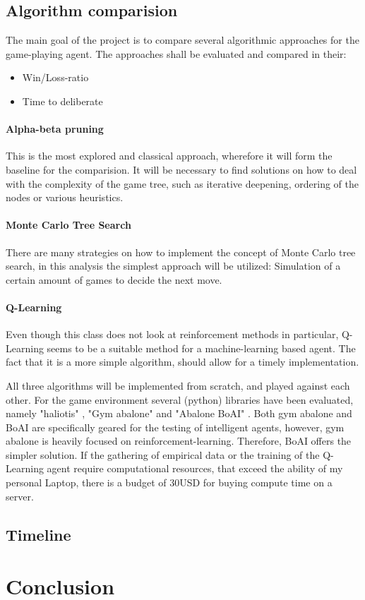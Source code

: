 \documentclass{llncs}
\begin{document}
\subsection{Algorithm comparision}
The main goal of the project is to compare several algorithmic approaches for the game-playing agent. The approaches shall be evaluated and compared in their:

\begin{itemize}
  \item Win/Loss-ratio
  \item Time to deliberate
\end{itemize}


\paragraph{Alpha-beta pruning}
This is the most explored and classical approach, wherefore it will form the baseline for the comparision. It will be necessary to find solutions on how to deal with the complexity of the game tree, such as iterative deepening, ordering of the nodes or various heuristics.

\paragraph{Monte Carlo Tree Search}
There are many strategies on how to implement the concept of Monte Carlo tree search, in this analysis the simplest approach will be utilized: Simulation of a certain amount of games to decide the next move.

\paragraph{Q-Learning}
Even though this class does not look at reinforcement methods in particular, Q-Learning seems to be a suitable method for a machine-learning based agent. The fact that it is a more simple algorithm, should allow for a timely implementation.

All three algorithms will be implemented from scratch, and played against each other. For the game environment several (python) libraries have been evaluated, namely "haliotis" \cite{noauthor_peer_nodate}, "Gym abalone" \cite{towzeur_towzeurgym-abalone_2021} and "Abalone BoAI" \cite{scriptim_scriptimabalone-boai_2021}. Both gym abalone and BoAI are specifically geared for the testing of intelligent agents, however, gym abalone is heavily focused on reinforcement-learning. Therefore, BoAI offers the simpler solution. If the gathering of empirical data or the training of the Q-Learning agent require computational resources, that exceed the ability of my personal Laptop, there is a budget of 30USD for buying compute time on a server.

\subsection{Timeline}

\section{Conclusion}



\end{document}

